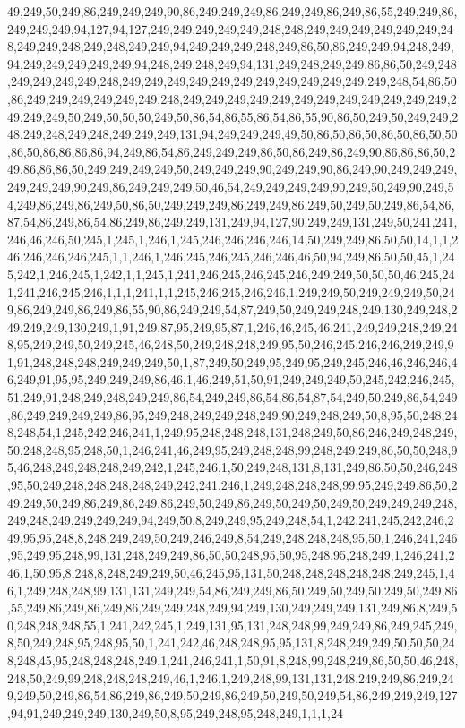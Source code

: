 49,249,50,249,86,249,249,249,90,86,249,249,249,86,249,249,86,249,86,55,249,249,86,249,249,249,94,127,94,127,249,249,249,249,249,248,248,249,249,249,249,249,249,248,249,249,248,249,248,249,249,94,249,249,249,248,249,86,50,86,249,249,94,248,249,94,249,249,249,249,249,94,248,249,248,249,94,131,249,248,249,249,86,86,50,249,248,249,249,249,249,248,249,249,249,249,249,249,249,249,249,249,249,249,248,54,86,50,86,249,249,249,249,249,249,248,249,249,249,249,249,249,249,249,249,249,249,249,249,249,249,50,249,50,50,50,249,50,86,54,86,55,86,54,86,55,90,86,50,249,50,249,249,248,249,248,249,248,249,249,249,131,94,249,249,249,49,50,86,50,86,50,86,50,86,50,50,86,50,86,86,86,86,94,249,86,54,86,249,249,249,86,50,86,249,86,249,90,86,86,86,50,249,86,86,86,50,249,249,249,249,50,249,249,249,90,249,249,90,86,249,90,249,249,249,249,249,249,90,249,86,249,249,249,50,46,54,249,249,249,249,90,249,50,249,90,249,54,249,86,249,86,249,50,86,50,249,249,249,86,249,249,86,249,50,249,50,249,86,54,86,87,54,86,249,86,54,86,249,86,249,249,131,249,94,127,90,249,249,131,249,50,241,241,246,46,246,50,245,1,245,1,246,1,245,246,246,246,246,14,50,249,249,86,50,50,14,1,1,246,246,246,246,245,1,1,246,1,246,245,246,245,246,246,46,50,94,249,86,50,50,45,1,245,242,1,246,245,1,242,1,1,245,1,241,246,245,246,245,246,249,249,50,50,50,46,245,241,241,246,245,246,1,1,1,241,1,1,245,246,245,246,246,1,249,249,50,249,249,249,50,249,86,249,249,86,249,86,55,90,86,249,249,54,87,249,50,249,249,248,249,130,249,248,249,249,249,130,249,1,91,249,87,95,249,95,87,1,246,46,245,46,241,249,249,248,249,248,95,249,249,50,249,245,46,248,50,249,248,248,249,95,50,246,245,246,246,249,249,91,91,248,248,248,249,249,249,50,1,87,249,50,249,95,249,95,249,245,246,46,246,246,46,249,91,95,95,249,249,249,86,46,1,46,249,51,50,91,249,249,249,50,245,242,246,245,51,249,91,248,249,248,249,249,86,54,249,249,86,54,86,54,87,54,249,50,249,86,54,249,86,249,249,249,249,86,95,249,248,249,249,248,249,90,249,248,249,50,8,95,50,248,248,248,54,1,245,242,246,241,1,249,95,248,248,248,131,248,249,50,86,246,249,248,249,50,248,248,95,248,50,1,246,241,46,249,95,249,248,248,99,248,249,249,86,50,50,248,95,46,248,249,248,248,249,242,1,245,246,1,50,249,248,131,8,131,249,86,50,50,246,248,95,50,249,248,248,248,248,249,242,241,246,1,249,248,248,248,99,95,249,249,86,50,249,249,50,249,86,249,86,249,86,249,50,249,86,249,50,249,50,249,50,249,249,249,248,249,248,249,249,249,249,94,249,50,8,249,249,95,249,248,54,1,242,241,245,242,246,249,95,95,248,8,248,249,249,50,249,246,249,8,54,249,248,248,248,95,50,1,246,241,246,95,249,95,248,99,131,248,249,249,86,50,50,248,95,50,95,248,95,248,249,1,246,241,246,1,50,95,8,248,8,248,249,249,50,46,245,95,131,50,248,248,248,248,248,249,245,1,46,1,249,248,248,99,131,131,249,249,54,86,249,249,86,50,249,50,249,50,249,50,249,86,55,249,86,249,86,249,86,249,249,248,249,94,249,130,249,249,249,131,249,86,8,249,50,248,248,248,55,1,241,242,245,1,249,131,95,131,248,248,99,249,249,86,249,245,249,8,50,249,248,95,248,95,50,1,241,242,46,248,248,95,95,131,8,248,249,249,50,50,50,248,248,45,95,248,248,248,249,1,241,246,241,1,50,91,8,248,99,248,249,86,50,50,46,248,248,50,249,99,248,248,248,249,46,1,246,1,249,248,99,131,131,248,249,249,86,249,249,249,50,249,86,54,86,249,86,249,50,249,86,249,50,249,50,249,54,86,249,249,249,127,94,91,249,249,249,130,249,50,8,95,249,248,95,248,249,1,1,1,24